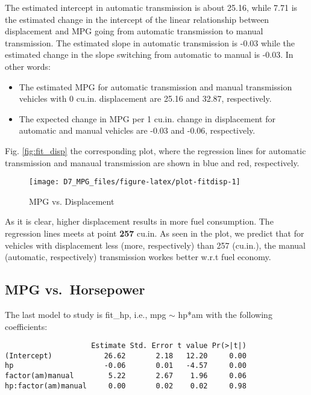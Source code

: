 \documentclass[]{article}
\begin{document}
The estimated intercept in automatic transmission is about 25.16, while
7.71 is the estimated change in the intercept of the linear relationship
between displacement and MPG going from automatic transmission to manual
transmission. The estimated slope in automatic transmission is -0.03
while the estimated change in the slope switching from automatic to
manual is -0.03. In other words:

\begin{itemize}
\item
  The estimated MPG for automatic transmission and manual transmission
  vehicles with 0 cu.in. displacement are 25.16 and 32.87, respectively.
\item
  The expected change in MPG per 1 cu.in. change in displacement for
  automatic and manual vehicles are -0.03 and -0.06, respectively.
\end{itemize}

Fig. \ref{fig:fit_disp} the corresponding plot, where the regression
lines for automatic transmission and manaual transmission are shown in
blue and red, respectively.

\begin{figure}[H]

{\centering \texttt{[image: D7\_MPG\_files/figure-latex/plot-fitdisp-1]} 

}

\caption{\label{fig:fit_disp}MPG vs. Displacement}\label{fig:plot-fitdisp}
\end{figure}

As it is clear, higher displacement results in more fuel consumption.
The regression lines meets at point \textbf{257} cu.in. As seen in the
plot, we predict that for vehicles with displacement less (more,
respectively) than 257 (cu.in.), the manual (automatic, respectively)
transmission workes better w.r.t fuel economy.

\hypertarget{sec-fit-hp}{\subsection{MPG
vs.~Horsepower}\label{sec-fit-hp}}

The last model to study is fit\_hp, i.e., mpg \(\sim\) hp*am with the
following coefficients:

\begin{verbatim}
                    Estimate Std. Error t value Pr(>|t|)
(Intercept)            26.62       2.18   12.20     0.00
hp                     -0.06       0.01   -4.57     0.00
factor(am)manual        5.22       2.67    1.96     0.06
hp:factor(am)manual     0.00       0.02    0.02     0.98
\end{verbatim}
\end{document}
